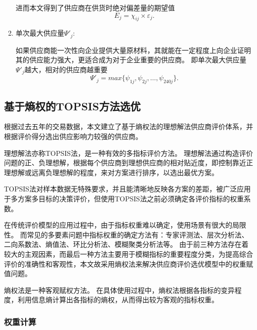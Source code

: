 \begin{enumerate}
进而本文得到了供应商在供货时绝对偏差量的期望值
\begin{equation}
    E_j=\chi_{ij} \times \varepsilon_j.
\end{equation}

\item 单次最大供应量$\Psi'_j$:

如果供应商能一次性向企业提供大量原材料，其就能在一定程度上向企业证明其的供应能力强大，更适合成为对于企业重要的供应商。
即单次最大供应量$\Psi'_j$越大，相对的供应商越重要
\begin{equation}
    \Psi'_j=max \{ \psi_{1j},\psi_{2j},\dots,\psi_{240j} \}.
\end{equation}

\end{enumerate}

\subsection{基于熵权的TOPSIS方法选优}
\label{选优}

根据过去五年的交易数据，本文建立了基于熵权法的理想解法供应商评价体系，并根据评价得分选出供应影响力较强的供应商。

理想解法亦称TOPSIS法，是一种有效的多指标评价方法。
理想解法通过构造评价问题的正、负理想解，根据每个供应商到理想供应商的相对贴近度，即控制靠近正理想解或远离负理想解的程度，来对方案进行排序，以选出最优方案。

TOPSIS法对样本数据无特殊要求，并且能清晰地反映各方案的差距，被广泛应用于多方案多目标的决策评价\cite{金王莉2018基于熵权}，但使用TOPSIS法之前必须确定各评价指标的权重系数。

在传统评价模型的应用过程中，由于指标权重难以确定，使用场景有很大的局限性。
而常见的多要素问题中指标权重的确定方法有：专家评测法、层次分析法、二向系数法、熵值法、环比分析法、模糊聚类分析法等。
由于前三种方法存在着较大的主观因素，而最后一种方法主要用于模糊指标的重要程度分类，为提高综合评价的准确性和客观性，本文故采用熵权法来解决供应商评价选优模型中的权重赋值问题\cite{供应链}。


熵权法是一种客观赋权方法。
在具体使用过程中，熵权法根据各指标的变异程度，利用信息熵计算出各指标的熵权，从而得出较为客观的指标权重。


\subsubsection{权重计算}

